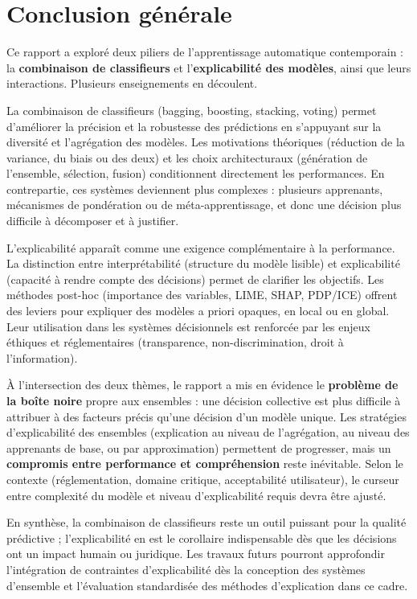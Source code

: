 \section{Conclusion générale}

Ce rapport a exploré deux piliers de l'apprentissage automatique contemporain : la \textbf{combinaison de classifieurs} et l'\textbf{explicabilité des modèles}, ainsi que leurs interactions. Plusieurs enseignements en découlent.

La combinaison de classifieurs (bagging, boosting, stacking, voting) permet d'améliorer la précision et la robustesse des prédictions en s'appuyant sur la diversité et l'agrégation des modèles. Les motivations théoriques (réduction de la variance, du biais ou des deux) et les choix architecturaux (génération de l'ensemble, sélection, fusion) conditionnent directement les performances. En contrepartie, ces systèmes deviennent plus complexes : plusieurs apprenants, mécanismes de pondération ou de méta-apprentissage, et donc une décision plus difficile à décomposer et à justifier.

L'explicabilité apparaît comme une exigence complémentaire à la performance. La distinction entre interprétabilité (structure du modèle lisible) et explicabilité (capacité à rendre compte des décisions) permet de clarifier les objectifs. Les méthodes post-hoc (importance des variables, LIME, SHAP, PDP/ICE) offrent des leviers pour expliquer des modèles a priori opaques, en local ou en global. Leur utilisation dans les systèmes décisionnels est renforcée par les enjeux éthiques et réglementaires (transparence, non-discrimination, droit à l'information).

À l'intersection des deux thèmes, le rapport a mis en évidence le \textbf{problème de la boîte noire} propre aux ensembles : une décision collective est plus difficile à attribuer à des facteurs précis qu'une décision d'un modèle unique. Les stratégies d'explicabilité des ensembles (explication au niveau de l'agrégation, au niveau des apprenants de base, ou par approximation) permettent de progresser, mais un \textbf{compromis entre performance et compréhension} reste inévitable. Selon le contexte (réglementation, domaine critique, acceptabilité utilisateur), le curseur entre complexité du modèle et niveau d'explicabilité requis devra être ajusté.

En synthèse, la combinaison de classifieurs reste un outil puissant pour la qualité prédictive ; l'explicabilité en est le corollaire indispensable dès que les décisions ont un impact humain ou juridique. Les travaux futurs pourront approfondir l'intégration de contraintes d'explicabilité dès la conception des systèmes d'ensemble et l'évaluation standardisée des méthodes d'explication dans ce cadre.
